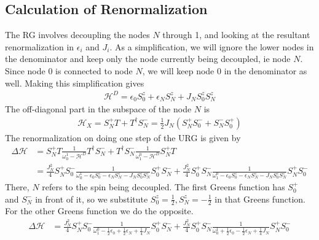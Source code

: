 \subsection{Calculation of Renormalization}

The RG involves decoupling the nodes \(N\) through 1, and looking at the resultant renormalization in \(\epsilon_i\) and \(J_i\). As a simplification, we will ignore the lower nodes in the denominator and keep only the node currently being decoupled, ie node \(N\). Since node \(0\) is connected to node \(N\), we will keep node \(0\) in the denominator as well. Making this simplification gives
\begin{equation}\begin{aligned}
	\label{stardiag}
\mathcal{H}^D =\epsilon_0 S^z_0 + \epsilon_N S^z_N + J_NS^z_0 S^z_N 
\end{aligned}\end{equation}
The off-diagonal part in the subspace of the node \(N\) is
\begin{equation}\begin{aligned}
\mathcal{H}_X = S_N^+ T + T^\dagger S_N^- = \frac{1}{2}J_N \left(S_N^+ S_0^- + S_N^- S_0^+\right)
\end{aligned}\end{equation}
The renormalization on doing one step of the URG is given by
\begin{equation}\begin{aligned}
	\Delta \mathcal{H} &=  S_N^+ T \frac{1}{\omega_0^1 - \mathcal{H}^D}T^\dagger  S_N^- + T^\dagger  S_N^- \frac{1}{\omega_1^0 - \mathcal{H}^D} S_N^+ T\\
			   &= \frac{J_N^2}{4}S_N^+ S_0^- \frac{1}{\omega_0^1 - \epsilon_0 S^z_0 - \epsilon_N S^z_N - J_NS^z_0 S^z_N}S_0^+  S_N^- + \frac{J_N^2}{4}S_0^+  S_N^- \frac{1}{\omega_1^0 - \epsilon_0 S^z_0 - \epsilon_N S^z_N - J_NS^z_0 S^z_N} S_N^+ S_0^-
\end{aligned}\end{equation}
There, \(N\) refers to the spin being decoupled. The first Greens function has \(S_0^+\) and \(S_N^-\) in front of it, so we substitute \(S_0^z = \frac{1}{2}, S_N^z = -\frac{1}{2}\) in that Greens function. For the other Greens function we do the opposite.
\begin{equation}\begin{aligned}
	\Delta \mathcal{H} &= \frac{J_N^2}{4}S_N^+ S_0^- \frac{1}{\omega_1^0 - \frac{1}{2}\epsilon_0  + \frac{1}{2}\epsilon_N + \frac{1}{4}J_N}S_0^+  S_N^- + \frac{J_N^2}{4}S_0^+  S_N^- \frac{1}{\omega_0^1 + \frac{1}{2}\epsilon_0 - \frac{1}{2}\epsilon_N + \frac{1}{4}J_N} S_N^+ S_0^-
\end{aligned}\end{equation}


